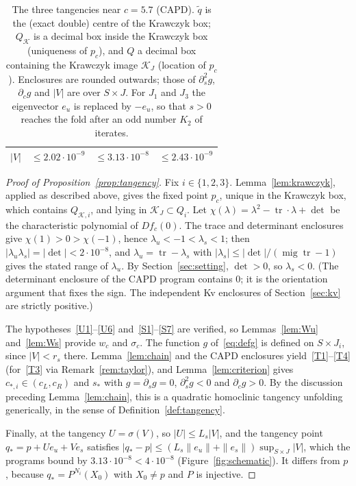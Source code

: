 \documentclass[11pt]{amsart}
\theoremstyle{definition}
\theoremstyle{remark}
\newcommand{\mig}{\operatorname{mig}}
\newcommand{\eu}{e_u}
\newcommand{\es}{e_s}
\newcommand{\Kr}{\mathcal{K}}
\begin{document}
\begin{table}[t]
\begin{tabular}{@{}llll@{}}
$|V|$ & $\le2.02\cdot10^{-9}$ & $\le3.13\cdot10^{-8}$ & $\le2.43\cdot10^{-9}$\\
\bottomrule
\end{tabular}
\vspace{4pt}
\caption{The three tangencies near $c=5.7$ (CAPD). $\tilde q$ is the (exact double) centre of the Krawczyk
box; $Q_\Kr$ is a decimal box inside the Krawczyk box (uniqueness of $p_c$), and $Q$ a decimal box containing
the Krawczyk image $\Kr_J$ (location of $p_c$). Enclosures are rounded outwards; those of $\partial_s^2g$, $\partial_cg$ and $|V|$ are over $S\times J$. For $J_1$ and $J_3$ the
eigenvector $\eu$ is replaced by $-\eu$, so that $s>0$ reaches the fold after an odd number $K_2$ of
iterates.}
\label{tab:near57}
\end{table}

\begin{proof}[Proof of Proposition~\ref{prop:tangency}]
Fix $i\in\{1,2,3\}$. Lemma~\ref{lem:krawczyk}, applied as described above, gives the fixed point $p_c$, unique
in the Krawczyk box, which contains $Q_{\Kr,i}$, and lying in $\Kr_J\subset Q_i$. Let
$\chi(\lambda)=\lambda^2-\operatorname{tr}\cdot\lambda+\det$ be the characteristic polynomial of $Df_c(0)$. The
trace and determinant enclosures give $\chi(1)>0>\chi(-1)$, hence $\lambda_u<-1<\lambda_s<1$; then
$|\lambda_u\lambda_s|=|\det|<2\cdot10^{-8}$, and $\lambda_u=\operatorname{tr}-\lambda_s$ with
$|\lambda_s|\le|\det|/(\mig\operatorname{tr}-1)$ gives the stated range of $\lambda_u$. By
Section~\ref{sec:setting}, $\det>0$, so $\lambda_s<0$. (The determinant enclosure of the CAPD program contains
$0$; it is the orientation argument that fixes the sign. The independent Kv enclosures of
Section~\ref{sec:kv} are strictly positive.)

The hypotheses~\ref{U1}--\ref{U6} and~\ref{S1}--\ref{S7} are verified, so Lemmas~\ref{lem:Wu}
and~\ref{lem:Ws} provide $w_c$ and $\sigma_c$. The function $g$ of~\eqref{eq:defg} is defined on $S\times J_i$,
since $|V|<r_s$ there. Lemma~\ref{lem:chain} and the CAPD enclosures yield~\ref{T1}--\ref{T4} (for~\ref{T3}
via Remark~\ref{rem:taylor}), and Lemma~\ref{lem:criterion} gives $c_{*,i}\in(c_L,c_R)$ and $s_*$ with
$g=\partial_sg=0$, $\partial_s^2g<0$ and $\partial_cg>0$. By the discussion preceding Lemma~\ref{lem:chain}, this
is a quadratic homoclinic tangency unfolding generically, in the sense of Definition~\ref{def:tangency}.

Finally, at the tangency $U=\sigma(V)$, so $|U|\le L_s|V|$, and the tangency point $q_*=p+U\eu+V\es$
satisfies $|q_*-p|\le(L_s\|\eu\|+\|\es\|)\sup_{S\times J}|V|$, which the programs bound by
$3.13\cdot10^{-8}<4\cdot10^{-8}$ (Figure~\ref{fig:schematic}). It differs from $p$, because $q_*=P^{N_i}(X_0)$
with $X_0\neq p$ and $P$ is injective.
\end{proof}
\end{document}
